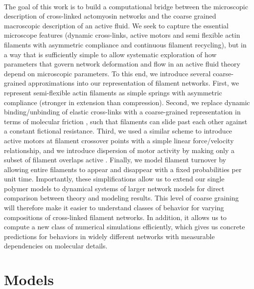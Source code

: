 \documentclass[10pt,letterpaper]{article}
\begin{document}
\paragraph{}  The goal of this work is to build a computational bridge between the microscopic description of cross-linked actomyosin networks and the coarse grained macroscopic description of an active fluid.  We seek to capture the essential microscope features (dynamic cross-links, active motors and semi flexible actin filaments with asymmetric compliance and continuous filament recycling), but in a way that is sufficiently simple to allow systematic exploration of how parameters that govern network deformation and flow in an active fluid theory depend on microscopic parameters. To this end, we introduce several coarse-grained approximations into our representation of filament networks. First, we represent semi-flexible actin filaments as simple springs with asymmetric compliance (stronger in extension than compression). Second, we replace  dynamic binding/unbinding of elastic cross-links with a coarse-grained representation in terms of molecular friction \cite{theo_friction,theo_frictionSam,theo_molefric}, such that filaments can slide past each other against a constant fictional resistance. Third, we used a similar scheme to introduce active motors at filament crossover points with a simple linear force/velocity relationship, and we introduce dispersion of motor activity by making only a subset of filament overlaps active \cite{theo_frictionShila}.  Finally, we model filament turnover by allowing entire filaments to appear and disappear with a fixed probabilities per unit time. Importantly, these simplifications allow us to extend our single polymer models to dynamical systems of larger network models for direct comparison between theory and modeling results. This level of coarse graining will therefore make it easier to understand classes of behavior for varying compositions of cross-linked filament networks. In addition, it allows us to compute a new class of numerical simulations efficiently, which gives us concrete predictions for behaviors in widely different networks with measurable dependencies on molecular details. 
  

\section*{Models}
\end{document}
